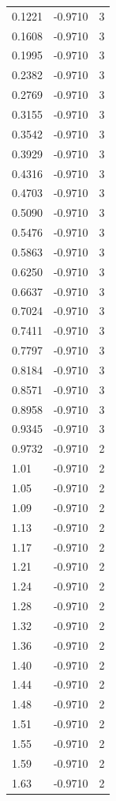 \begin{longtable}{lrr}
  0.1221 & -0.9710 & 3 \\
  0.1608 & -0.9710 & 3 \\
  0.1995 & -0.9710 & 3 \\
  0.2382 & -0.9710 & 3 \\
  0.2769 & -0.9710 & 3 \\
  0.3155 & -0.9710 & 3 \\
  0.3542 & -0.9710 & 3 \\
  0.3929 & -0.9710 & 3 \\
  0.4316 & -0.9710 & 3 \\
  0.4703 & -0.9710 & 3 \\
  0.5090 & -0.9710 & 3 \\
  0.5476 & -0.9710 & 3 \\
  0.5863 & -0.9710 & 3 \\
  0.6250 & -0.9710 & 3 \\
  0.6637 & -0.9710 & 3 \\
  0.7024 & -0.9710 & 3 \\
  0.7411 & -0.9710 & 3 \\
  0.7797 & -0.9710 & 3 \\
  0.8184 & -0.9710 & 3 \\
  0.8571 & -0.9710 & 3 \\
  0.8958 & -0.9710 & 3 \\
  0.9345 & -0.9710 & 3 \\
  0.9732 & -0.9710 & 2 \\
  1.01 & -0.9710 & 2 \\
  1.05 & -0.9710 & 2 \\
  1.09 & -0.9710 & 2 \\
  1.13 & -0.9710 & 2 \\
  1.17 & -0.9710 & 2 \\
  1.21 & -0.9710 & 2 \\
  1.24 & -0.9710 & 2 \\
  1.28 & -0.9710 & 2 \\
  1.32 & -0.9710 & 2 \\
  1.36 & -0.9710 & 2 \\
  1.40 & -0.9710 & 2 \\
  1.44 & -0.9710 & 2 \\
  1.48 & -0.9710 & 2 \\
  1.51 & -0.9710 & 2 \\
  1.55 & -0.9710 & 2 \\
  1.59 & -0.9710 & 2 \\
  1.63 & -0.9710 & 2 \\

\end{longtable}

